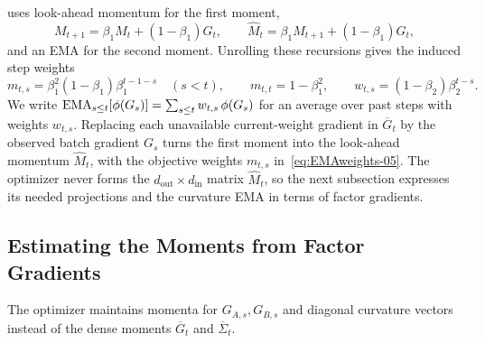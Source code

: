 uses look-ahead momentum for the first moment,
\[
  M_{t+1}=\beta_1M_t+(1-\beta_1)G_t,
  \qquad
  \widehat M_t=\beta_1M_{t+1}+(1-\beta_1)G_t,
\]
and an EMA for the second moment. Unrolling these recursions
gives the induced step weights
\begin{equation}\label{eq:EMAweights-05}
  m_{t,s}=\beta_1^2(1-\beta_1)\beta_1^{t-1-s}
  \quad(s<t),
  \qquad
  m_{t,t}=1-\beta_1^2,
  \qquad
  w_{t,s}=(1-\beta_2)\beta_2^{t-s}.
\end{equation}
We write $\operatorname{EMA}_{s\le t}[\phi(G_s)]=\sum_{s\le t}w_{t,s}\,\phi(G_s)$ for an
average over past steps with weights $w_{t,s}$. Replacing each unavailable
current-weight gradient in $\overline G_t$ by the observed batch gradient
$G_s$ turns the first moment into the look-ahead momentum $\widehat M_t$,
with the objective weights $m_{t,s}$ in~\eqref{eq:EMAweights-05}. The
optimizer never forms the $d_{\mathrm{out}}\times d_{\mathrm{in}}$ matrix
$\widehat M_t$, so the next subsection expresses its needed projections and
the curvature EMA in terms of factor gradients.

\subsection{Estimating the Moments from Factor Gradients}
\label{sec:weighted-estimation-05}

The optimizer maintains momenta for $G_{A,s},G_{B,s}$ and diagonal
curvature vectors instead of the dense moments $\overline G_t$ and
$\overline\Sigma_t$.

